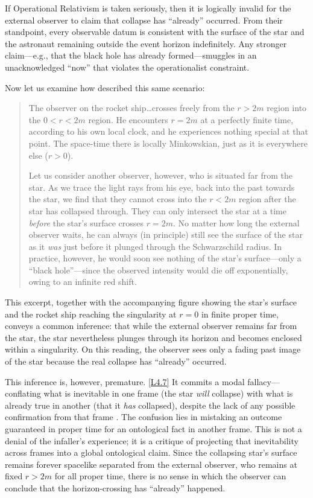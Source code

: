 \documentclass[12pt]{book}
\newcounter{logicanchor}
\newenvironment{logicanchorenv}[1]{\refstepcounter{logicanchor}\label{#1}}{}
\newcommand{\logiclink}[2]{\begin{logicanchorenv}{logic:#1}\end{logicanchorenv}\hyperref[appendix:#1]{[#1]}\xspace}
\begin{document}
If Operational Relativism is taken seriously, then it is logically invalid for the external observer to claim that collapse has ``already'' occurred. From their standpoint, every observable datum is consistent with the surface of the star and the astronaut remaining outside the event horizon indefinitely. Any stronger claim---e.g., that the black hole has already formed---smuggles in an unacknowledged ``now'' that violates the operationalist constraint.

Now let us examine how \citet{Penrose1969} described this same scenario:
\begin{quote}
    The observer on the rocket ship\ldots crosses freely from the $r > 2m$ region into the $0 < r < 2m$ region. He encounters $r = 2m$ at a perfectly finite time, according to his own local clock, and he experiences nothing special at that point. The space-time there is locally Minkowskian, just as it is everywhere else ($r > 0$).

    Let us consider another observer, however, who is situated far from the star. As we trace the light rays from his eye, back into the past towards the star, we find that they cannot cross into the $r < 2m$ region after the star has collapsed through. They can only intersect the star at a time \textit{before} the star's surface crosses $r = 2m$. No matter how long the external observer waits, he can always (in principle) still see the surface of the star as it \textit{was} just before it plunged through the Schwarzschild radius. In practice, however, he would soon see nothing of the star's surface---only a ``black hole''---since the observed intensity would die off exponentially, owing to an infinite red shift.
\end{quote}

This excerpt, together with the accompanying figure showing the star's surface and the rocket ship reaching the singularity at $r = 0$ in finite proper time, conveys a common inference: that while the external observer remains far from the star, the star nevertheless plunges through its horizon and becomes enclosed within a singularity. On this reading, the observer sees only a fading past image of the star because the real collapse has ``already'' occurred.

This inference is, however, premature. \logiclink{L4.7}{} It commits a modal fallacy---conflating what is inevitable in one frame (the star \textit{will} collapse) with what is already true in another (that it \textit{has} collapsed), despite the lack of any possible confirmation from that frame \citep{Curiel2017}. The confusion lies in mistaking an outcome guaranteed in proper time for an ontological fact in another frame. This is not a denial of the infaller's experience; it is a critique of projecting that inevitability across frames into a global ontological claim. Since the collapsing star's surface remains forever spacelike separated from the external observer, who remains at fixed $r > 2m$ for all proper time, there is no sense in which the observer can conclude that the horizon-crossing has ``already'' happened.
\end{document}
